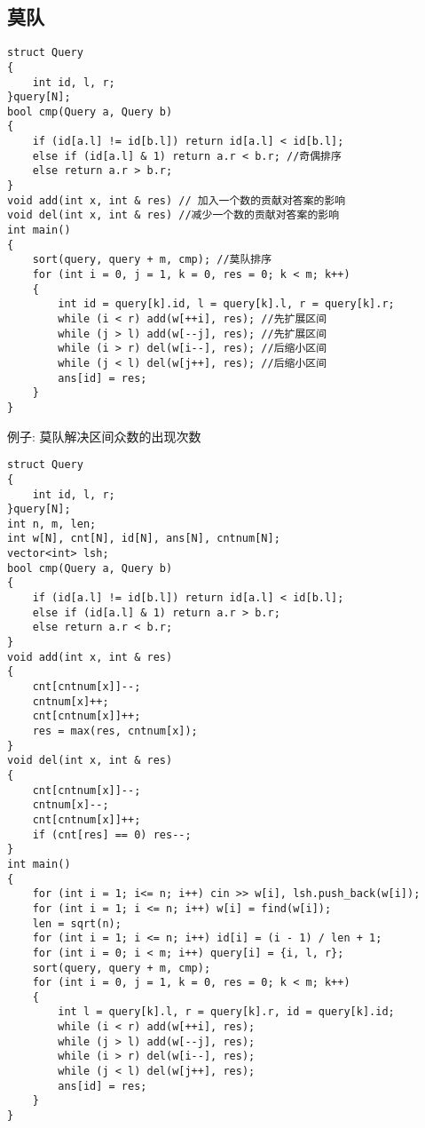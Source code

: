 \documentclass[a4paper, fontset=none]{ctexart}
\begin{document}
\subsection{莫队}
\begin{verbatim}
struct Query
{
    int id, l, r;
}query[N];
bool cmp(Query a, Query b)
{
    if (id[a.l] != id[b.l]) return id[a.l] < id[b.l];
    else if (id[a.l] & 1) return a.r < b.r; //奇偶排序
    else return a.r > b.r;
}
void add(int x, int & res) // 加入一个数的贡献对答案的影响
void del(int x, int & res) //减少一个数的贡献对答案的影响
int main()
{
    sort(query, query + m, cmp); //莫队排序
    for (int i = 0, j = 1, k = 0, res = 0; k < m; k++)
    {
        int id = query[k].id, l = query[k].l, r = query[k].r;
        while (i < r) add(w[++i], res); //先扩展区间
        while (j > l) add(w[--j], res); //先扩展区间
        while (i > r) del(w[i--], res); //后缩小区间
        while (j < l) del(w[j++], res); //后缩小区间
        ans[id] = res;
    }
}
\end{verbatim}
例子: 莫队解决区间众数的出现次数
\begin{verbatim}
struct Query
{
    int id, l, r;
}query[N];
int n, m, len;
int w[N], cnt[N], id[N], ans[N], cntnum[N];
vector<int> lsh;
bool cmp(Query a, Query b)
{
    if (id[a.l] != id[b.l]) return id[a.l] < id[b.l];
    else if (id[a.l] & 1) return a.r > b.r;
    else return a.r < b.r;
}
void add(int x, int & res)
{
    cnt[cntnum[x]]--;
    cntnum[x]++;
    cnt[cntnum[x]]++;
    res = max(res, cntnum[x]);
}
void del(int x, int & res)
{
    cnt[cntnum[x]]--;
    cntnum[x]--;
    cnt[cntnum[x]]++;
    if (cnt[res] == 0) res--;
}
int main()
{
    for (int i = 1; i<= n; i++) cin >> w[i], lsh.push_back(w[i]);
    for (int i = 1; i <= n; i++) w[i] = find(w[i]);
    len = sqrt(n);
    for (int i = 1; i <= n; i++) id[i] = (i - 1) / len + 1;
    for (int i = 0; i < m; i++) query[i] = {i, l, r};
    sort(query, query + m, cmp);
    for (int i = 0, j = 1, k = 0, res = 0; k < m; k++)
    {
        int l = query[k].l, r = query[k].r, id = query[k].id;
        while (i < r) add(w[++i], res);
        while (j > l) add(w[--j], res);
        while (i > r) del(w[i--], res);
        while (j < l) del(w[j++], res);
        ans[id] = res;
    }
}
\end{verbatim}
\end{document}
